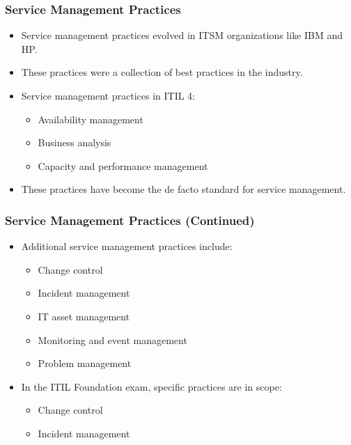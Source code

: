 \documentclass[aspectratio=169, table]{beamer}
\begin{document}
\begin{frame}
	\frametitle{Service Management Practices}
	
	\begin{itemize}
		\item Service management practices evolved in ITSM organizations like IBM and HP.
		\item These practices were a collection of best practices in the industry.
		\item Service management practices in ITIL 4:
		\begin{itemize}
			\item Availability management
			\item Business analysis
			\item Capacity and performance management
		\end{itemize}
		\item These practices have become the de facto standard for service management.
	\end{itemize}
	
\end{frame}

\begin{frame}
	\frametitle{Service Management Practices (Continued)}
	
	\begin{itemize}
		\item Additional service management practices include:
		\begin{itemize}
			\item Change control
			\item Incident management
			\item IT asset management
			\item Monitoring and event management
			\item Problem management
		\end{itemize}
		\item In the ITIL Foundation exam, specific practices are in scope:
		\begin{itemize}
			\item Change control
			\item Incident management
		\end{itemize}
	\end{itemize}
	
\end{frame}
\end{document}
